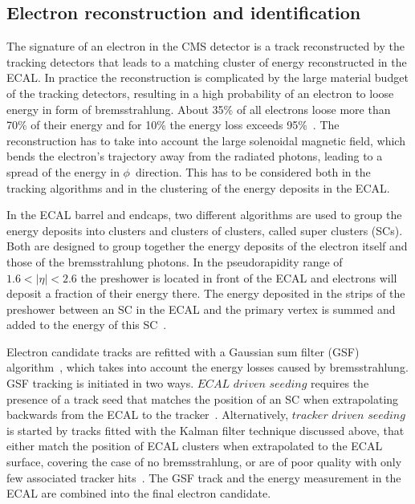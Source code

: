 \subsection{Electron reconstruction and identification}
The signature of an electron in the CMS detector is a track reconstructed by the tracking detectors that leads to a matching cluster of energy reconstructed in the ECAL. In practice the reconstruction is complicated by the large material budget of the tracking detectors, resulting in a high probability of an electron to loose energy in form of bremsstrahlung. About 35\% of all electrons loose more than 70\% of their energy and for 10\% the energy loss exceeds 95\%~\cite{Baffioni:2006cd}. The reconstruction has to take into account the large solenoidal magnetic field, which bends the electron's trajectory away from the radiated photons, leading to a spread of the energy in $\phi$~direction. This has to be considered both in the tracking algorithms and in the clustering of the energy deposits in the ECAL. 

In the ECAL barrel and endcaps, two different algorithms are used to group the energy deposits into clusters and clusters of clusters, called super clusters (SCs). Both are designed to group together the energy deposits of the electron itself and those of the bremsstrahlung photons. In the pseudorapidity range of $1.6 < |\eta| < 2.6$ the preshower is located in front of the ECAL and electrons will deposit a fraction of their energy there. The energy deposited in the strips of the preshower between an SC in the ECAL and the primary vertex is summed and added to the energy of this SC~\cite{Anderson:1365024}. 

Electron candidate tracks are refitted with a Gaussian sum filter (GSF) algorithm~\cite{FruhwirtGSFCMS}, which takes into account the energy losses caused by bremsstrahlung. GSF tracking is initiated in two ways. $\textit{ECAL driven seeding}$ requires the presence of a track seed that matches the position of an SC when extrapolating backwards from the ECAL to the tracker~\cite{Baffioni:2006cd}. Alternatively, $\textit{tracker driven seeding}$ is started by tracks fitted with the Kalman filter technique discussed above, that either match the position of ECAL clusters when extrapolated to the ECAL surface, covering the case of no bremsstrahlung, or are of poor quality with only few associated tracker hits~\cite{Chatrchyan:2014fea}. The GSF track and the energy measurement in the ECAL are combined into the final electron candidate. 


